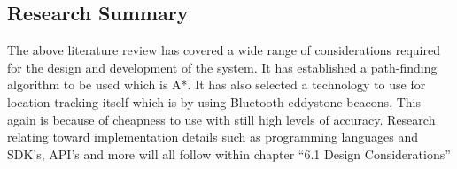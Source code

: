 \subsection{Research Summary}
The above literature review has covered a wide range of considerations required for the design and development of the system. It has established a path-finding algorithm to be used which is A*. It has also selected a technology to use for location tracking itself which is by using Bluetooth eddystone beacons. This again is because of cheapness to use with still high levels of accuracy.
Research relating toward implementation details such as programming languages and SDK’s, API’s and more will all follow within chapter “6.1 Design Considerations”
